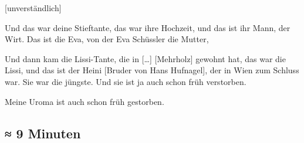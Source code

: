 \documentclass[ngerman,]{article}
\providecommand{\tightlist}{%
  \setlength{\itemsep}{0pt}\setlength{\parskip}{0pt}}
\begin{document}
\begin{multicols}{3}
{[}unverständlich{]}

\begin{description}
\tightlist
\item[Käthe]
Und das war deine Stieftante, das war ihre Hochzeit, und das ist ihr
Mann, der Wirt. Das ist die Eva, von der Eva Schüssler die Mutter,
\item[Käthe]
Und dann kam die Lissi-Tante, die in {[}\ldots{}{]} {[}Mehrholz{]}
gewohnt hat, das war die Lissi, und das ist der Heini {[}Bruder von Hans
Hufnagel{]}, der in Wien zum Schluss war. Sie war die jüngste. Und sie
ist ja auch schon früh verstorben.
\item[Ruth]
Meine Uroma ist auch schon früh gestorben.
\end{description}

\hypertarget{minuten}{%
\subsection{≈ 9 Minuten}\label{minuten}}


\end{multicols}
\end{document}
